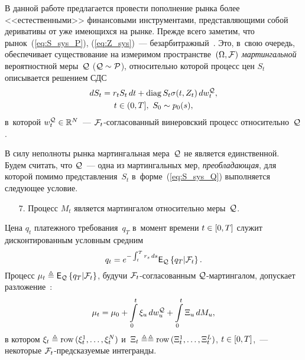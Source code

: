 \begin{multicols}{2}
В данной работе предлагается провести пополнение рынка более <<естественными>> финансовыми инструментами, представляющими собой 
деривативы от уже имеющихся на рынке. Прежде всего заметим, что рынок~(\ref{eq:S_sys_P}), (\ref{eq:Z_sys})~--- безарбитражный~\cite{Criens_20}. 
Это, в~свою очередь, обеспечивает существование на измеримом пространстве~$(\Omega, {\mathcal F})$ \textit{мартингальной} вероятностной меры~${\mathcal Q}$ ($\qqq \hm\sim \ppp$),
относительно которой процесс цен $S_t$ описывается решением СДС
 \begin{multline}
  dS_t =r_t S_t \,dt + \mathrm{diag}\, S_t \sigma(t,Z_t)\,dw_t^{{\mathcal Q}},\\
  t \in (0,T], \ S_0 \sim p_0(s),
  \label{eq:S_sys_Q}
  \end{multline}
  в~которой $w_t^{{\mathcal Q}} \in \mathbb{R}^N$~--- ${\mathcal F}_t$-со\-гла\-со\-ван\-ный винеровский процесс относительно~${\mathcal Q}$.

  В силу неполноты рынка мартингальная мера~${\mathcal Q}$ не является единственной. Будем считать, что ${\mathcal Q}$~--- одна из мартингальных мер, 
  \textit{преобладающая}, для которой помимо представления~$S_t$ в~форме~(\ref{eq:S_sys_Q}) выполняется следующее условие.
  \begin{enumerate}
  \item[7.] Процесс $M_t$ является мартингалом относительно меры~${\mathcal Q}$.
  \end{enumerate}
  Цена $q_t$ платежного требования~$q_T$ в~момент времени $t \hm\in [0,T]$ служит дисконтированным условным средним
 $$
 q_t = e^{-\int\nolimits_t^T r_s\,ds}\mathsf{E}_{ {\mathcal Q} }\left\{ \mathop{q_T|{\mathcal F}_t} \right\}.
$$
  Процесс $\mu_t \triangleq \mathsf{E}_{ {\mathcal Q} }\left\{ \mathop{q_T|{\mathcal F}_t} \right\}$, будучи ${\mathcal F}_t$-со\-гла\-со\-ван\-ным ${\mathcal Q}$-мар\-тин\-га\-лом, допускает разложение~\cite{Elliott_76}:
\begin{equation}
\mu_t = \mu_0 + \int\limits_0^t \xi_u \,dw_u^{{\mathcal Q}}+  \int\limits_0^t \Xi_u \,dM_u,
\label{eq:mu_1}
\end{equation}
в котором $\xi_t \triangleq
\mathop{\mathrm{row\,}} (\xi_t^1,\ldots,\xi_t^N)$ и~$\Xi_t \triangleq\linebreak \triangleq
\row (\Xi_t^1,\ldots,\Xi_t^L)$, $t \hm\in [0,T]$,~--- некоторые ${\mathcal F}_t$-пред\-ска\-зу\-емые интегранды.


\end{multicols}
